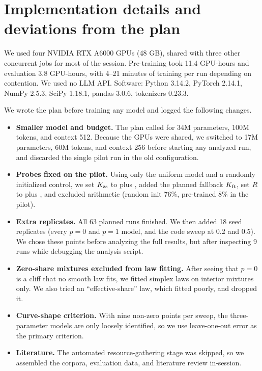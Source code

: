 \section{Implementation details and deviations from the plan}
\label{app:details}

We used four NVIDIA RTX A6000 GPUs (48 GB), shared with three other concurrent jobs for most of the session.
Pre-training took 11.4 GPU-hours and evaluation 3.8 GPU-hours, with 4--21 minutes of training per run depending on contention.
We used no LLM API.
Software: Python 3.14.2, PyTorch 2.14.1, NumPy 2.5.3, SciPy 1.18.1, pandas 3.0.6, tokenizers 0.23.3.

We wrote the plan before training any model and logged the following changes.
\begin{itemize}[leftmargin=*,itemsep=0pt,topsep=0pt]
    \item \textbf{Smaller model and budget.} The plan called for 34M parameters, 100M tokens, and context 512. Because the GPUs were shared, we switched to 17M parameters, 60M tokens, and context 256 before starting any analyzed run, and discarded the single pilot run in the old configuration.
    \item \textbf{Probes fixed on the pilot.} Using only the uniform model and a randomly initialized control, we set $K_{\mathrm{zs}}$ to \sciq plus \arceasy, added the planned fallback $K_{\mathrm{ft}}$, set $R$ to \listops plus \proofwriter, and excluded arithmetic (random init 76\%, pre-trained 8\% in the pilot).
    \item \textbf{Extra replicates.} All 63 planned runs finished. We then added 18 seed replicates (every $p=0$ and $p=1$ model, and the code sweep at 0.2 and 0.5). We chose these points before analyzing the full results, but after inspecting 9 runs while debugging the analysis script.
    \item \textbf{Zero-share mixtures excluded from law fitting.} After seeing that $p=0$ is a cliff that no smooth law fits, we fitted simplex laws on interior mixtures only. We also tried an ``effective-share'' law, which fitted poorly, and dropped it.
    \item \textbf{Curve-shape criterion.} With nine non-zero points per sweep, the three-parameter models are only loosely identified, so we use leave-one-out error as the primary criterion.
    \item \textbf{Literature.} The automated resource-gathering stage was skipped, so we assembled the corpora, evaluation data, and literature review in-session.
\end{itemize}
